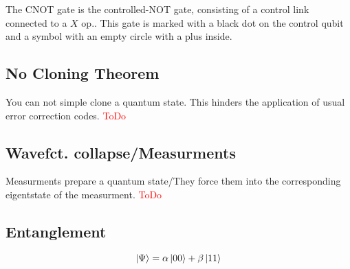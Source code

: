 The CNOT gate is the controlled-NOT gate, consisting of a control link connected to a $X$ op.. 
This gate is marked with a black dot on the control qubit and a symbol with an empty circle with a plus inside.


\subsection{No Cloning Theorem}
You can not simple clone a quantum state. 
This hinders the application of usual error correction codes.
\textcolor{red}{ToDo}

\subsection{Wavefct. collapse/Measurments}
Measurments prepare a quantum state/They force them into the corresponding eigentstate of the measurment.
\textcolor{red}{ToDo}

\subsection{Entanglement}
\begin{equation}
    \ket{\Psi} = \alpha \ket{00} + \beta \ket{11}
\end{equation}
